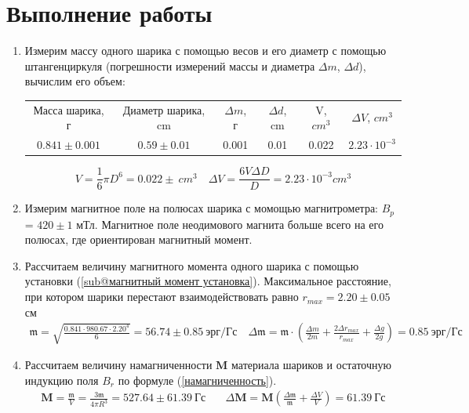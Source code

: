 \documentclass[a4paper, 10pt]{article}
\begin{document}
\section*{Выполнение работы}
\begin{enumerate}
    \item Измерим массу одного шарика с помощью весов и его диаметр с помощью штангенциркуля (погрешности измерений массы и диаметра $\Delta m$, $\Delta d$), вычислим его объем:
    \begin{center}
    \begin{tabular}{|c|c|c|c|c|c|}
            \hline
            Масса шарика, г & Диаметр шарика, cm & $\Delta m$, г & $\Delta d$, cm & V, $cm^{3}$ & $\Delta V$, $cm^{3}$\\
            $0.841\pm 0.001$ & $0.59\pm 0.01$ & 0.001 & 0.01 & 0.022 & $2.23\cdot 10^{-3}$\\
            \hline
        \end{tabular}
    \end{center}
    \begin{equation*}
        V = \frac{1}{6}\pi D^{6} = 0.022\pm \ cm^{3} \quad \Delta V = \frac{6V\Delta D}{D} = 2.23\cdot 10^{-3} cm^{3}
    \end{equation*}
    \item Измерим магнитное поле на полюсах шарика с момощью магнитрометра: ${B_{p}}$ = $420\pm 1$ мТл. Магнитное поле неодимового магнита больше всего
    на его полюсах, где ориентирован магнитный момент.
    \item Рассчитаем величину магнитного момента одного шарика с помощью установки (\ref{sub@магнитный момент установка}). Максимальное
    расстояние, при котором шарики перестают взаимодействовать равно $r_{max} = 2.20\pm 0.05$ см
    \begin{align*}
        \mathfrak{m} = \sqrt{\frac{0.841\cdot 980.67\cdot 2.20^{4}}{6}} = 56.74\pm 0.85\ \text{эрг/Гс} \quad
        \Delta \mathfrak{m} = {\mathfrak{m}}\cdot \left(\frac{\Delta m}{2m} + \frac{2\Delta r_{max}}{r_{max}} + \frac{\Delta g}{2g}\right) = 0.85\ \text{эрг/Гс}
    \end{align*}
    \item Рассчитаем величину намагниченности $\mathbf{M}$ материала шариков и остаточную индукцию поля ${B_{r}}$ по формуле (\ref{намагниченность}).
    \begin{align*}
        \mathbf{M} = \frac{\mathfrak{m}}{V} = \frac{3\mathfrak{m}}{4\pi R^{3}} = 527.64\pm 61.39\ \text{Гс} & \quad \Delta \mathbf{M} = \mathbf{M}\left(\frac{\Delta \mathfrak{m}}{\mathfrak{m}} + \frac{\Delta V}{V}\right) = 61.39\ \text{Гс}\\

\end{align*}
\end{enumerate}
\end{document}
